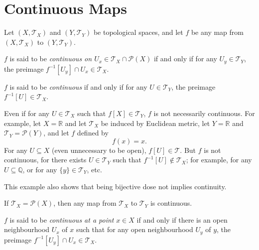 \section{Continuous Maps}

Let $(X, \mathcal T_X)$ and $(Y, \mathcal T_Y)$ be topological spaces, and let $f$ be any map from $(X, \mathcal T_X)$ to $(Y, \mathcal T_Y)$.


\begin{definition}
	$f$ is said to be \textit{continuous on $U_x \in \mathcal T_X \cap \mathcal P(X)$} if and only if for any $U_y \in \mathcal T_Y$, the preimage $f^{-1}[U_y] \cap U_x \in \mathcal T_X$.
\end{definition}


\begin{definition}
	$f$ is said to be \textit{continuous} if and only if for any $U \in \mathcal T_Y$, the preimage $f^{-1}[U] \in \mathcal T_X$.
\end{definition}


\begin{example}
	Even if for any $U \in \mathcal T_X$ such that $f[X] \in \mathcal T_Y$, $f$ is not necessarily continuous. For example, let $X = \mathbb R$ and let $\mathcal T_X$ be induced by Euclidean metric, let $Y = \mathbb R$ and $\mathcal T_Y = \mathcal P(Y)$, and let $f$ defined by
	$$
	f(x) = x.
	$$
	For any $U \subseteq X$ (even unnecessary to be open), $f[U] \in \mathcal T$. But $f$ is not continuous, for there exists $U \in \mathcal T_Y$ such that $f^{-1}[U] \notin \mathcal T_X$; for example, for any $U \subseteq \mathbb Q$, or for any $\{y\} \in \mathcal T_Y$, etc.
	
	This example also shows that being bijective dose not implies continuity.  
\end{example}


\begin{example}
	If $\mathcal T_X = \mathcal P(X)$, then any map from $\mathcal T_X$ to $\mathcal T_Y$ is continuous.
\end{example}


\begin{definition}
	$f$ is said to be \textit{continuous at a point} $x \in X$ if and only if there is an open neighbourhood $U_x$ of $x$ such that for any open neighbourhood $U_y$ of $y$, the preimage $f^{-1}[U_y] \cap U_x \in \mathcal T_X$.
\end{definition}


